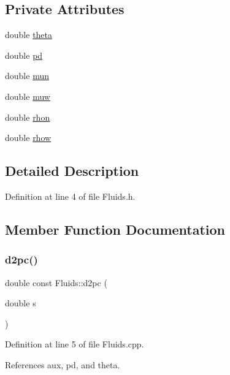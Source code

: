 \subsection*{Private Attributes}
\begin{DoxyCompactItemize}
\item 
double \hyperlink{classFluids_aff18bebcaee137af75b319822a9dd8a8}{theta}
\item 
double \hyperlink{classFluids_a4a6a5567a51aeb163014715a961f58d8}{pd}
\item 
double \hyperlink{classFluids_a72205d7f9a6550265327b181b00db124}{mun}
\item 
double \hyperlink{classFluids_acde1b9068adb4e1cceed3a273161059d}{muw}
\item 
double \hyperlink{classFluids_a0a06cdfa97511a3e2fd4e0cdb2cdaba5}{rhon}
\item 
double \hyperlink{classFluids_a1967a64f25be380857f24ac62b532693}{rhow}
\end{DoxyCompactItemize}


\subsection{Detailed Description}


Definition at line 4 of file Fluids.\+h.



\subsection{Member Function Documentation}
\mbox{\label{classFluids_a860c3c2af6dae8c158a78770dfc76ce8}} 
\subsubsection{\texorpdfstring{d2pc()}{d2pc()}}
{\footnotesize\ttfamily double const Fluids\+::d2pc (\begin{DoxyParamCaption}\item[{double}]{s }\end{DoxyParamCaption})}



Definition at line 5 of file Fluids.\+cpp.



References aux, pd, and theta.



